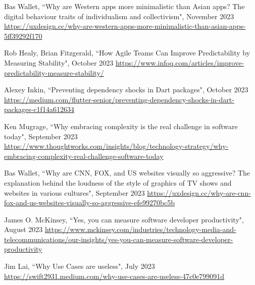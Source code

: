 \begin{thebibliography}{100}


 Bas Wallet, ``Why are Western apps more minimalistic than Asian apps? The digital behaviour 
traits of individualism and collectivism", November 2023
\href{https://uxdesign.cc/why-are-western-apps-more-minimalistic-than-asian-apps-5ff39292f170}{https://uxdesign.cc/why-are-western-apps-more-minimalistic-than-asian-apps-5ff39292f170}

 Rob Healy, Brian Fitzgerald, ``How Agile Teams Can Improve Predictability by Measuring 
Stability", October 2023 
\href{https://www.infoq.com/articles/improve-predictability-measure-stability/}{https://www.infoq.com/articles/improve-predictability-measure-stability/}

 Alexey Inkin, ``Preventing dependency shocks in Dart packages", October 2023
\href{https://medium.com/flutter-senior/preventing-dependency-shocks-in-dart-packages-c1f14a612634}{https://medium.com/flutter-senior/preventing-dependency-shocks-in-dart-packages-c1f14a612634}

 Ken Mugrage, ``Why embracing complexity is the real challenge in software today", September 2023 
\href{https://www.thoughtworks.com/insights/blog/technology-strategy/why-embracing-complexity-real-challenge-software-today}{https://www.thoughtworks.com/insights/blog/technology-strategy/why-embracing-complexity-real-challenge-software-today}

 Bas Wallet, ``Why are CNN, FOX, and US websites visually so aggressive?
The explanation behind the loudness of the style of graphics of TV shows and websites in various cultures", September 2023
\href{https://uxdesign.cc/why-are-cnn-fox-and-us-websites-visually-so-aggressive-efe99270bc5b}{https://uxdesign.cc/why-are-cnn-fox-and-us-websites-visually-so-aggressive-efe99270bc5b}

 James O. McKinsey, ``Yes, you can measure software developer productivity", August 2023
\href{https://www.mckinsey.com/industries/technology-media-and-telecommunications/our-insights/yes-you-can-measure-software-developer-productivity}{https://www.mckinsey.com/industries/technology-media-and-telecommunications/our-insights/yes-you-can-measure-software-developer-productivity}

 Jim Lai, ``Why Use Cases are useless", July 2023
\href{https://swift2931.medium.com/why-use-cases-are-useless-47c0e799091d}{https://swift2931.medium.com/why-use-cases-are-useless-47c0e799091d}


\end{thebibliography}

